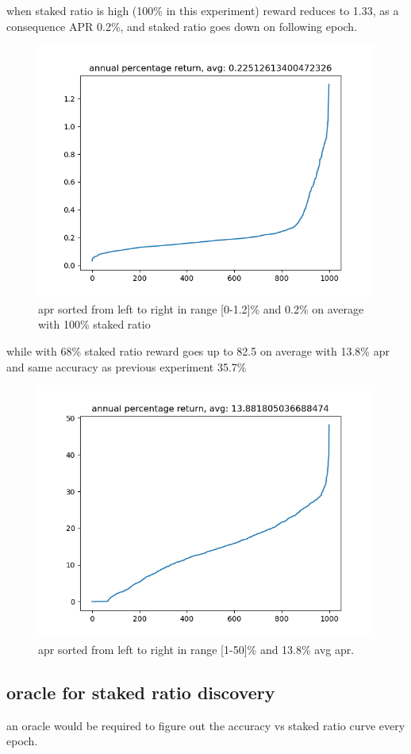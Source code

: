 \documentclass{article}
\begin{document}
\begin{description}
\item when staked ratio is high (100\% in this experiment) reward reduces to 1.33, as a consequence APR 0.2\%, and staked ratio goes down on following epoch.
  \begin{figure}
    \includegraphics{fullstake_apr.png}
    \caption{apr sorted from left to right in range [0-1.2]\% and 0.2\% on average with 100\% staked ratio}
  \end{figure}
\item while with 68\% staked ratio reward goes up to 82.5 on average with 13.8\% apr and same accuracy as previous experiment 35.7\%
  \begin{figure}
    \includegraphics{halfstake_apr.png}
    \caption{apr sorted from left to right in range [1-50]\% and 13.8\% avg apr.}
  \end{figure}

  \subsection {oracle for staked ratio discovery}
  an oracle would be required to figure out the accuracy vs staked ratio curve every epoch.

\end{description}
\end{document}
